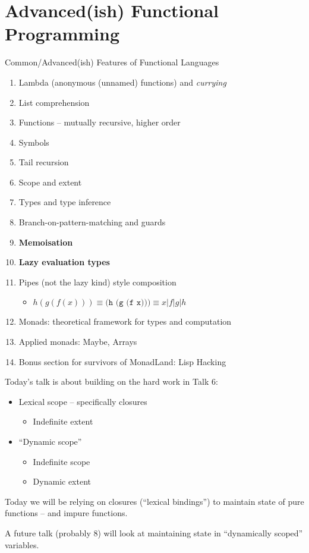 \documentclass[presentation]{beamer}
\begin{document}
\section{Advanced(ish) Functional Programming}
\begin{frame}{Common/Advanced(ish) Features of Functional Languages}
\label{sec:org95ddb74}

\begin{enumerate}
\item Lambda (anonymous (unnamed) functions) and \emph{currying}
\item List comprehension
\item Functions -- mutually recursive, higher order
\item Symbols
\item Tail recursion
\item Scope and extent
\item Types and type inference
\item Branch-on-pattern-matching and guards
\item \textbf{Memoisation}
\item \textbf{Lazy evaluation types}
\item Pipes (not the lazy kind) style composition
\begin{itemize}
\item  \(h(g(f(x)))\equiv\texttt{(h (g (f x)))}\equiv{}x\vert{f}\vert{g}\vert{h}\)
\end{itemize}
\item Monads: theoretical framework for types and computation
\item Applied monads: Maybe, Arrays
\item Bonus section for survivors of MonadLand: Lisp Hacking
\end{enumerate}

\end{frame}

\begin{frame}{Today's talk}
  is about building on the hard work in Talk 6:
  \begin{itemize}
  \item Lexical scope -- specifically closures
    \begin{itemize}
    \item Indefinite extent
    \end{itemize}
  \item ``Dynamic scope''
    \begin{itemize}
    \item Indefinite scope
    \item Dynamic extent
    \end{itemize}
  \end{itemize}
  Today we will be relying on closures (``lexical bindings'') to maintain state of pure functions -- and impure functions.

  A future talk (probably 8) will look at maintaining state in ``dynamically scoped'' variables.
\end{frame}
\end{document}
